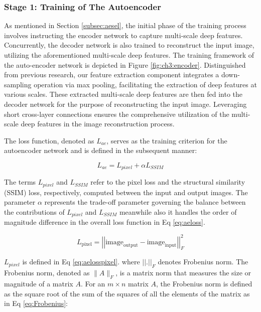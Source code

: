 \subsubsection{Stage 1: Training of The Autoencoder} \label{subsec:aeloss}
As mentioned in Section \ref{subsec:aesel}, the initial phase of the training process involves instructing the encoder network to capture multi-scale deep features. Concurrently, the decoder network is also trained to reconstruct the input image, utilizing the aforementioned multi-scale deep features. The training framework of the auto-encoder network is depicted in Figure \ref{fig:ch3:encoder}. Distinguished from previous research, our feature extraction component integrates a down-sampling operation via max pooling, facilitating the extraction of deep features at various scales. These extracted multi-scale deep features are then fed into the decoder network for the purpose of reconstructing the input image. Leveraging short cross-layer connections ensures the comprehensive utilization of the multi-scale deep features in the image reconstruction process.

The loss function, denoted as $L_{ae}$, serves as the training criterion for the autoencoder network and is defined in the subsequent manner:

\begin{equation}\label{eq:aeloss}
    L_{ae} = L_{pixel} + \alpha  L_{SSIM}
\end{equation}

The terms $L_{pixel}$ and $L_{SSIM}$ refer to the pixel loss and the structural similarity (SSIM) loss, respectively, computed between the input and output images. The parameter $\alpha$ represents the trade-off parameter governing the balance between the contributions of $L_{pixel}$ and $L_{SSIM}$ meanwhile also it handles the order of magnitude difference in the overall loss function in Eq \ref{eq:aeloss}. 

\begin{equation}\label{eq:aelosspixel}
    L_{\text{pixel}} = \left\lvert \left\lvert\text{image}_{\text{output}} - \text{image}_{\text{input}} \right\rvert \right\rvert _{F}^{2}
\end{equation}

$L_{pixel}$ is defined in Eq \ref{eq:aelosspixel}. where $\left\lvert \left\lvert\text{.} \right\rvert \right\rvert _{F}$ denotes Frobenius norm. The Frobenius norm, denoted as $\|A\|_F$, is a matrix norm that measures the size or magnitude of a matrix $A$. For an $m \times n$ matrix $A$, the Frobenius norm is defined as the square root of the sum of the squares of all the elements of the matrix as in Eq \ref{eq:Frobenius}:

